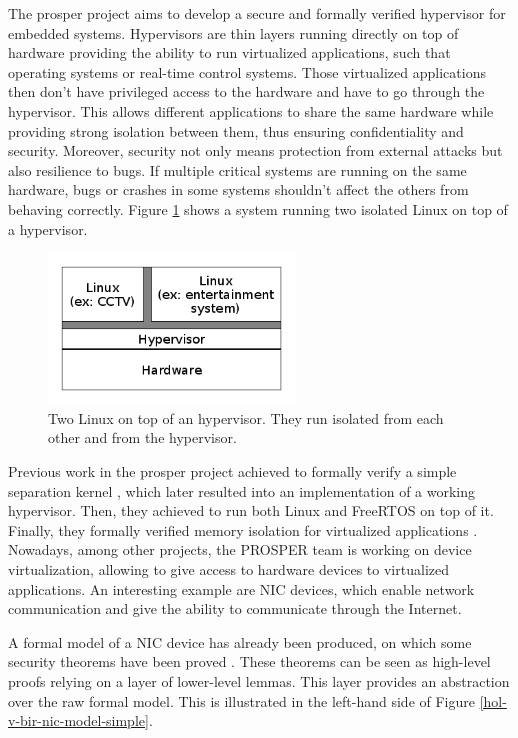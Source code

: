 \documentclass[10pt,a4paper]{article}
\begin{document}
The {prosper} project \cite{noauthor_prosper:_nodate} aims to develop a secure and formally verified hypervisor for embedded systems. Hypervisors are thin layers running directly on top of hardware providing the ability to run virtualized applications, such that operating systems or real-time control systems. Those virtualized applications then don't have privileged access to the hardware and have to go through the hypervisor. This allows different applications to share the same hardware while providing strong isolation between them, thus ensuring confidentiality and security. Moreover, security not only means protection from external attacks but also resilience to bugs. If multiple critical systems are running on the same hardware, bugs or crashes in some systems shouldn't affect the others from behaving correctly. Figure \ref{figure-hypervisor-simple} shows a system running two isolated Linux on top of a hypervisor.

\begin{figure}[H]
	\includegraphics[height=4cm]{figures/figure-hypervisor-simple.png}
	\centering
	\caption{Two Linux on top of an hypervisor. They run isolated from each other and from the hypervisor.}
	\label{figure-hypervisor-simple}
\end{figure}

Previous work in the {prosper} project achieved to formally verify a simple separation kernel \cite{noauthor_prosper:_nodate-1,dam_formal_2013}, which later resulted into an implementation of a working hypervisor. Then, they achieved to run both Linux and {FreeRTOS} on top of it. Finally, they formally verified memory isolation for virtualized applications \cite{nemati_trustworthy_2015}. Nowadays, among other projects, the PROSPER team is working on device virtualization, allowing to give access to hardware devices to virtualized applications. An interesting example are {NIC} devices, which enable network communication and give the ability to communicate through the Internet.

A formal model of a {NIC} device has already been produced, on which some security theorems have been proved \cite{haglund_formal_2016}. These theorems can be seen as high-level proofs relying on a layer of lower-level lemmas. This layer provides an abstraction over the raw formal model. This is illustrated in the left-hand side of Figure \ref{hol-v-bir-nic-model-simple}.
\end{document}
